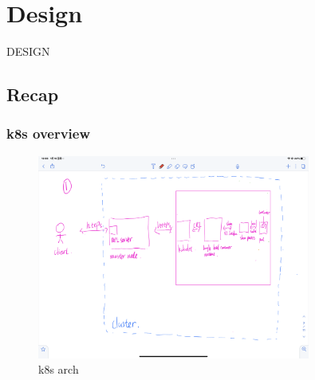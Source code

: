 \chapter{Design}
\label{sec:design}





DESIGN





\section{Recap}

\subsection{k8s overview}

    \begin{figure}[H]
        \centering
        \includegraphics[width=0.8\textwidth]{images/IMG_4416.PNG}
        \caption[k8s arch]{k8s arch}
        \label{fig:k8s}
    \end{figure}

